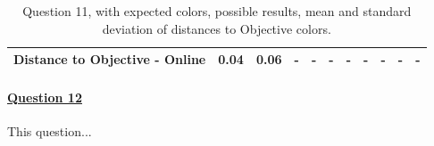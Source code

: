 \begin{table}[H]
{\begin{tabular}{lccccccccccccc}
    \multicolumn{4}{l}{Distance to Objective - Online}                                                                                               & \multicolumn{1}{|c}{0.04}        & \multicolumn{1}{c|}{0.06}    & \multicolumn{1}{|c}{-}        & \multicolumn{1}{c|}{-}    & \multicolumn{1}{|c}{-}       & \multicolumn{1}{c|}{-}    & \multicolumn{1}{|c}{-}        & \multicolumn{1}{c|}{-}    & \multicolumn{1}{|c}{-}       & \multicolumn{1}{c|}{-}    \\ \hline
    \end{tabular}}
  \caption[Question 11, with expected Results.]{Question 11, with expected colors, possible results, mean and standard deviation of distances to Objective colors.}
  \label{table:lab_q11_expected}
\end{table}
%
\paragraph{\ul{Question 12}}
%
This question...
%
